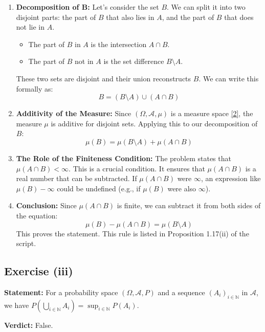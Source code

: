 \documentclass[11pt,a4paper]{article}
\begin{document}
\begin{enumerate}
    \item \textbf{Decomposition of B:} Let's consider the set $B$. We can split it into two disjoint parts: the part of $B$ that also lies in $A$, and the part of $B$ that does not lie in $A$.
    \begin{itemize}
        \item The part of $B$ in $A$ is the intersection $A \cap B$.
        \item The part of $B$ not in $A$ is the set difference $B \setminus A$.
    \end{itemize}
    These two sets are disjoint and their union reconstructs $B$. We can write this formally as:
    \[
        B = (B \setminus A) \cup (A \cap B)
    \]

    \item \textbf{Additivity of the Measure:} Since $(\Omega, \mathcal{A}, \mu)$ is a measure space \hyperlink{note2}{[2]}, the measure $\mu$ is additive for disjoint sets. Applying this to our decomposition of $B$:
    \[
        \mu(B) = \mu(B \setminus A) + \mu(A \cap B)
    \]

    \item \textbf{The Role of the Finiteness Condition:} The problem states that $\mu(A \cap B) < \infty$. This is a crucial condition. It ensures that $\mu(A \cap B)$ is a real number that can be subtracted. If $\mu(A \cap B)$ were $\infty$, an expression like $\mu(B) - \infty$ could be undefined (e.g., if $\mu(B)$ were also $\infty$).

    \item \textbf{Conclusion:} Since $\mu(A \cap B)$ is finite, we can subtract it from both sides of the equation:
    \[
        \mu(B) - \mu(A \cap B) = \mu(B \setminus A)
    \]
    This proves the statement. This rule is listed in Proposition 1.17(ii) of the script.
\end{enumerate}

\subsection*{Exercise (iii)}
\textbf{Statement:} For a probability space $(\Omega, \mathcal{A}, P)$ and a sequence $(A_i)_{i \in \mathbb{N}}$ in $\mathcal{A}$, we have $P\left(\bigcup_{i \in \mathbb{N}} A_i\right) = \sup_{i \in \mathbb{N}} P(A_i)$.

\vspace{1em}

\textbf{Verdict:} False.
\end{document}
